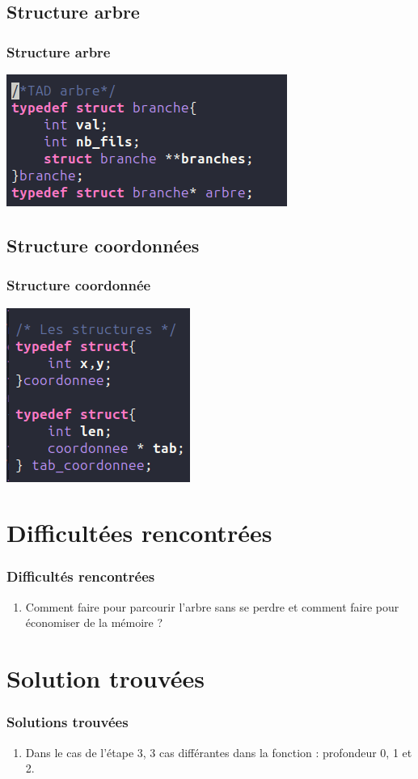 \documentclass[9pt]{beamer}
\begin{document}
\subsection{Structure arbre}
\begin{frame}
  \frametitle{Structure arbre}
  \includegraphics[scale=0.4]{fich/struct_arbre.png}
\end{frame}

\subsection{Structure coordonnées}
\begin{frame}
  \frametitle{Structure coordonnée}
  \includegraphics[scale=0.4]{fich/struct_coordonnees.png}
\end{frame}

\section{Difficultées rencontrées}
\begin{frame}
  \frametitle{Difficultés rencontrées}
  \begin{enumerate}
  \item Comment faire pour parcourir l'arbre sans se perdre et comment faire pour économiser de la mémoire ?
  \end{enumerate}
\end{frame}

\section{Solution trouvées}
\begin{frame}
  \frametitle{Solutions trouvées}
  \begin{enumerate}
  \item Dans le cas de l'étape 3, 3 cas différantes dans la fonction : profondeur 0, 1 et 2.   
  \end{enumerate}
\end{frame}
\end{document}
